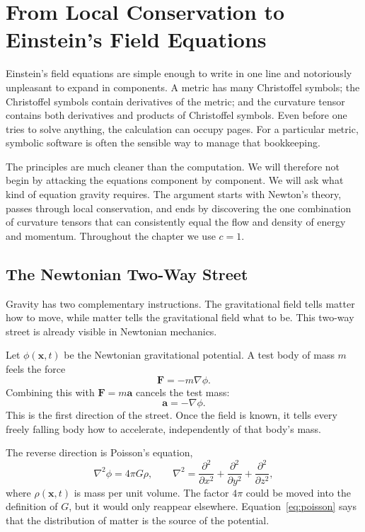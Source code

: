 \chapter{From Local Conservation to Einstein's Field Equations}

Einstein's field equations are simple enough to write in one line and
notoriously unpleasant to expand in components. A metric has many Christoffel
symbols; the Christoffel symbols contain derivatives of the metric; and the
curvature tensor contains both derivatives and products of Christoffel
symbols. Even before one tries to solve anything, the calculation can occupy
pages. For a particular metric, symbolic software is often the sensible way
to manage that bookkeeping.

The principles are much cleaner than the computation. We will therefore not
begin by attacking the equations component by component. We will ask what
kind of equation gravity requires. The argument starts with Newton's theory,
passes through local conservation, and ends by discovering the one
combination of curvature tensors that can consistently equal the flow and
density of energy and momentum. Throughout the chapter we use \(c=1\).

\section{The Newtonian Two-Way Street}

Gravity has two complementary instructions. The gravitational field tells
matter how to move, while matter tells the gravitational field what to be.
This two-way street is already visible in Newtonian mechanics.

Let \(\phi(\mathbf{x},t)\) be the Newtonian gravitational potential. A test
body of mass \(m\) feels the force
\begin{equation}
 \mathbf{F}=-m\nabla\phi.
\end{equation}
Combining this with \(\mathbf{F}=m\mathbf{a}\) cancels the test mass:
\begin{equation}
 \mathbf{a}=-\nabla\phi.
\end{equation}
This is the first direction of the street. Once the field is known, it tells
every freely falling body how to accelerate, independently of that body's
mass.

The reverse direction is Poisson's equation,
\begin{equation}
 \nabla^2\phi=4\pi G\rho,
 \qquad
 \nabla^2=
 \frac{\partial^2}{\partial x^2}
 +\frac{\partial^2}{\partial y^2}
 +\frac{\partial^2}{\partial z^2},
 \label{eq:poisson}
\end{equation}
where \(\rho(\mathbf{x},t)\) is mass per unit volume. The factor \(4\pi\)
could be moved into the definition of \(G\), but it would only reappear
elsewhere. Equation~\eqref{eq:poisson} says that the distribution of matter
is the source of the potential.

